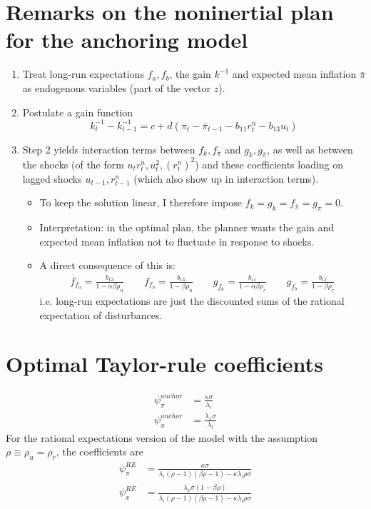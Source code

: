 \documentclass[11pt]{article}
\renewcommand{\[}{\begin{equation}}
\renewcommand{\]}{\end{equation}}
\begin{document}
\section{Remarks on the noninertial plan for the anchoring model}
\begin{enumerate}
\item Treat long-run expectations $f_a, f_b$, the gain $k^{-1}$ and expected mean inflation $\bar{\pi}$ as endogenous variables (part of the vector $z$).
\item Postulate a gain function 
\begin{equation}
k_t^{-1} -k_{t-1}^{-1} = c + d(\pi_t -\bar{\pi}_{t-1} - b_{11}r_t^n - b_{13}u_t)
\end{equation}
\item Step 2 yields interaction terms between $f_k,f_{\bar{\pi}}$ and $g_k, g_{\bar{\pi}}$, as well as between the shocks (of the form $u_tr_t^n, u_t^2, (r_t^n)^2$) and these coefficients loading on lagged shocks $u_{t-1}, r_{t-1}^n$ (which also show up in interaction terms). 
\begin{itemize}
\item To keep the solution linear, I therefore impose $f_k = g_k = f_{\bar{\pi}} = g_{\bar{\pi}} = 0$. 
\item[] Interpretation: in the optimal plan, the planner wants the gain and expected mean inflation not to fluctuate in response to shocks.
\item A direct consequence of this is:
\begin{align}
f_{f_a} = \frac{b_{13}}{1-\alpha  \beta  \rho _u}\quad \quad  f_{f_b}=  \frac{b_{13}}{1-\beta  \rho _u} \quad \quad g_{f_a}  = \frac{b_{11}}{1-\alpha  \beta  \rho _r} \quad \quad g_{f_b} = \frac{b_{11}}{1-\beta  \rho _r}
\end{align}
i.e. long-run expectations are just the discounted sums of the rational expectation of disturbances.
\end{itemize}
\end{enumerate}

\section{Optimal Taylor-rule coefficients}
\begin{align}
\psi_{\pi}^{anchor} & = \frac{\kappa  \sigma }{\lambda_i} \label{opt_psipi_anchor}
\\
\psi_{x}^{anchor} & =  \frac{\lambda_x\sigma }{\lambda_i } \label{opt_psix_anchor}
\end{align}
For the rational expectations version of the model with the assumption $\rho \equiv \rho_u = \rho_r$, the coefficients are
\begin{align}
\psi_{\pi}^{RE} & = \frac{\kappa  \sigma }{\lambda_i(\rho -1) (\beta  \rho -1)-\kappa  \lambda_i \rho  \sigma } \label{opt_psipi_RE}
\\
\psi_{x}^{RE} & =  \frac{\lambda_x\sigma  (1-\beta  \rho )}{\lambda_i (\rho -1) (\beta  \rho -1)-\kappa  \lambda_i \rho  \sigma } \label{opt_psix_RE}
\end{align}
\end{document}
